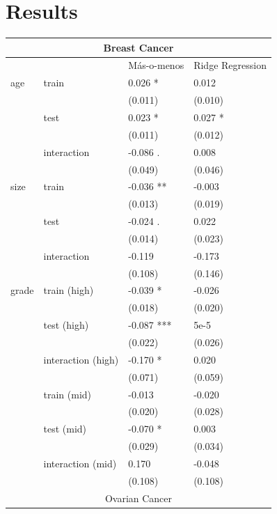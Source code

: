 \documentclass{bioinfo}
\begin{document}
\section{Results}

\begin{table}[htbp]
  \centering
    \begin{tabular}{llll}
    \toprule
    \multicolumn{4}{c}{Breast Cancer} \\
    \midrule
          &       & M\'{a}s-o-menos & Ridge Regression \\
    \hline
    age   & train & 0.026 * & 0.012 \\
          &       & (0.011) & (0.010) \\
          & test  & 0.023 * & 0.027 * \\
          &       & (0.011) & (0.012) \\
          & interaction & -0.086 . & 0.008 \\
          &       & (0.049) & (0.046) \\
    size  & train & -0.036 ** & -0.003 \\
          &       & (0.013) & (0.019) \\
          & test  & -0.024 . & 0.022 \\
          &       & (0.014) & (0.023) \\
          & interaction & -0.119 & -0.173 \\
          &       & (0.108) & (0.146) \\
    grade & train (high) & -0.039 * & -0.026 \\
          &       & (0.018) & (0.020) \\
          & test (high) & -0.087 *** & 5e-5 \\
          &       & (0.022) & (0.026) \\
          & interaction (high) & -0.170 * & 0.020 \\
          &       & (0.071) & (0.059) \\
          & train (mid) & -0.013 & -0.020 \\
          &       & (0.020) & (0.028) \\
          & test (mid) & -0.070 * & 0.003 \\
          &       & (0.029) & (0.034) \\
          & interaction (mid) & 0.170 & -0.048 \\
          &       & (0.108) & (0.108) \\
	\hline    
    \multicolumn{4}{c}{Ovarian Cancer} \\

\end{tabular}
\end{table}
\end{document}
